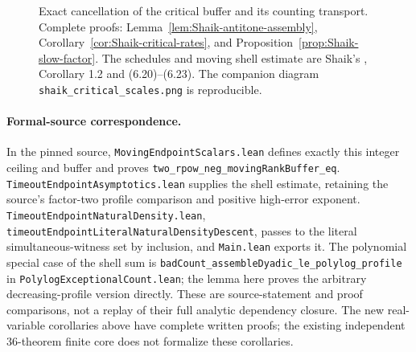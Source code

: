 \begin{figure}[ht]
\centering
{}
\caption{Exact cancellation of the critical buffer and its counting
transport. Complete proofs: Lemma~\ref{lem:Shaik-antitone-assembly},
Corollary~\ref{cor:Shaik-critical-rates}, and
Proposition~\ref{prop:Shaik-slow-factor}.
The schedules and moving shell estimate are Shaik's
\cite{Shaik2026v324}, Corollary 1.2 and (6.20)--(6.23).
The companion diagram \texttt{shaik\_critical\_scales.png} is reproducible.}
\end{figure}

\paragraph{Formal-source correspondence.}
In the pinned source, \texttt{MovingEndpointScalars.lean} defines exactly
this integer ceiling and buffer and proves
\texttt{two\_rpow\_neg\_movingRankBuffer\_eq}.
\texttt{TimeoutEndpointAsymptotics.lean} supplies the shell estimate,
retaining the source's factor-two profile comparison and positive
high-error exponent. \texttt{TimeoutEndpointNaturalDensity.lean},
\texttt{timeoutEndpointLiteralNaturalDensityDescent}, passes to the
literal simultaneous-witness set by inclusion, and \texttt{Main.lean}
exports it. The polynomial special case of the shell sum is
\texttt{badCount\_assembleDyadic\_le\_polylog\_profile} in
\texttt{PolylogExceptionalCount.lean}; the lemma here proves the
arbitrary decreasing-profile version directly.
These are source-statement and proof comparisons, not a replay of
their full analytic dependency closure. The new real-variable
corollaries above have complete written proofs; the existing independent
36-theorem finite core does not formalize these corollaries.

